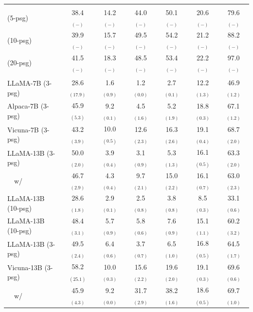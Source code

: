 \documentclass[11pt]{article}
\newcommand{\vani}{{\sc{Vanilla}}}
\newcommand{\summ}{{\sc{Summ}}}
\newcommand{\snippet}{{\sc{Snippet}}}
\newcommand{\rerank}{{\sc{Rerank}}}
\newcommand{\oracle}{{\sc{Oracle}}}
\newcommand{\tableskip}{\noalign{\vskip 2pt}}
\newcommand{\headercolorlong}{\rowcolor{gray!17}}
\begin{document}
\begin{table}[h]
\begin{tabular}{lcccccc}
            \headercolorlong
            \tableskip
            \multicolumn{7}{c}{\textbf{GPT-4}} \\
            \tableskip

            \vani{} (5-psg)  & 38.4 $_{(-)}$&14.2 $_{(-)}$&44.0 $_{(-)}$&50.1 $_{(-)}$&20.6 $_{(-)}$&79.6 $_{(-)}$\\
            \vani{} (10-psg) & 39.9 $_{(-)}$&15.7 $_{(-)}$&49.5 $_{(-)}$&54.2 $_{(-)}$&21.2 $_{(-)}$&88.2 $_{(-)}$\\
            \vani{} (20-psg) & 41.5 $_{(-)}$&18.3 $_{(-)}$&48.5 $_{(-)}$&53.4 $_{(-)}$&22.2 $_{(-)}$&97.0 $_{(-)}$\\

            \headercolorlong
            \tableskip
            \multicolumn{7}{c}{\textbf{Open-source} } \\
            \tableskip
            LLaMA-7B \vani{} (3-psg) & 28.6 $_{(17.9)}$ & 1.6 $_{(0.9)}$ & 1.2 $_{(0.0)}$ & 2.7 $_{(0.1)}$ & 12.2 $_{(1.3)}$ & 46.9 $_{(1.2)}$ \\
            Alpaca-7B \vani{} (3-psg) & 45.9 $_{(5.3)}$ & 9.2 $_{(0.1)}$ & 4.5 $_{(1.6)}$ & 5.2 $_{(1.9)}$ & 18.8 $_{(0.3)}$ & 67.1 $_{(1.2)}$ \\
            Vicuna-7B \vani{} (3-psg) & 43.2 $_{(3.9)}$ & 10.0 $_{(0.5)}$ & 12.6 $_{(2.3)}$ & 16.3 $_{(2.6)}$ & 19.1 $_{(0.4)}$ & 68.7 $_{(2.0)}$ \\ \midrule
            LLaMA-13B \vani{} (3-psg) & 50.0 $_{(2.0)}$ & 3.9 $_{(0.4)}$ & 3.1 $_{(0.9)}$ & 5.3 $_{(1.3)}$ & 16.1 $_{(0.5)}$ & 63.3 $_{(2.0)}$ \\
            ~~w/ \rerank & 46.7 $_{(2.9)}$ & 4.3 $_{(0.4)}$ & 9.7 $_{(2.1)}$ & 15.0 $_{(2.2)}$ & 16.1 $_{(0.7)}$ & 63.0 $_{(2.3)}$ \\
            LLaMA-13B \summ{} (10-psg) & 28.6 $_{(1.8)}$ & 2.9 $_{(0.1)}$ & 2.5 $_{(0.8)}$ & 3.8 $_{(0.8)}$ & 8.5 $_{(0.3)}$ & 33.1 $_{(0.6)}$ \\
            LLaMA-13B \snippet{} (10-psg) & 48.4 $_{(3.1)}$ & 5.7 $_{(0.9)}$ & 5.8 $_{(0.6)}$ & 7.6 $_{(0.9)}$ & 15.1 $_{(1.1)}$ & 60.2 $_{(3.2)}$ \\
            LLaMA-13B \oracle{} (3-psg) & 49.5 $_{(2.4)}$ & 6.4 $_{(0.6)}$ & 3.7 $_{(0.7)}$ & 6.5 $_{(1.0)}$ & 16.8 $_{(0.5)}$ & 64.5 $_{(1.7)}$ \\ \midrule
            Vicuna-13B \vani{} (3-psg) & 58.2 $_{(25.1)}$ & 10.0 $_{(0.3)}$ & 15.6 $_{(2.2)}$ & 19.6 $_{(2.0)}$ & 19.1 $_{(0.3)}$ & 69.6 $_{(0.6)}$ \\
            ~~w/ \rerank & 45.9 $_{(4.3)}$ & 9.2 $_{(0.0)}$ & 31.7 $_{(2.9)}$ & 38.2 $_{(1.6)}$ & 18.6 $_{(0.5)}$ & 69.7 $_{(1.0)}$ \\

\end{tabular}
\end{table}
\end{document}

